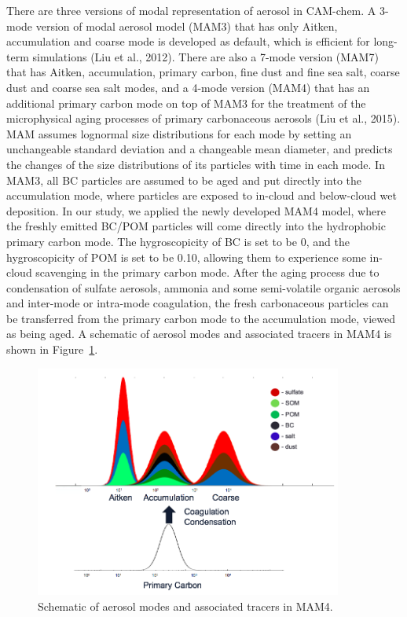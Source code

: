 \documentclass[12pt]{article}
\begin{document}
		There are three versions of modal representation of aerosol in CAM-chem. A 3-mode version of modal aerosol model (MAM3) that has only Aitken, accumulation and coarse mode is developed as default, which is efficient for long-term simulations (Liu et al., 2012). There are also a 7-mode version (MAM7) that has Aitken, accumulation, primary carbon, fine dust and fine sea salt, coarse dust and coarse sea salt modes, and a 4-mode version (MAM4) that has an additional primary carbon mode on top of MAM3 for the treatment of the microphysical aging processes of primary carbonaceous aerosols (Liu et al., 2015). MAM assumes lognormal size distributions for each mode by setting an unchangeable standard deviation and a changeable mean diameter, and predicts the changes of the size distributions of its particles with time in each mode. In MAM3, all BC particles are assumed to be aged and put directly into the accumulation mode, where particles are exposed to in-cloud and below-cloud wet deposition. In our study, we applied the newly developed MAM4 model, where the freshly emitted BC/POM particles will come directly into the hydrophobic primary carbon mode. The hygroscopicity of BC is set to be 0, and the hygroscopicity of POM is set to be 0.10, allowing them to experience some in-cloud scavenging in the primary carbon mode. After the aging process due to condensation of sulfate aerosols, ammonia and some semi-volatile organic aerosols and inter-mode or intra-mode coagulation, the fresh carbonaceous particles can be transferred from the primary carbon mode to the accumulation mode, viewed as being aged. A schematic of aerosol modes and associated tracers in MAM4 is shown in Figure~\ref{fig_P1}.
		\begin{figure}[!h] 
			\begin{center}
				\includegraphics[width = 0.9\textwidth]{Figure01}
				\caption[]{\label{fig_P1} Schematic of aerosol modes and associated tracers in MAM4.}
			\end{center}
		\end{figure}
			
\end{document}
